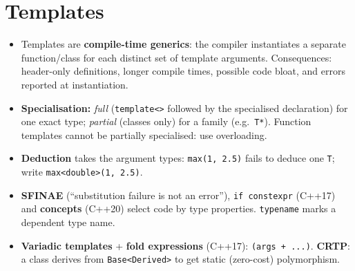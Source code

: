 \documentclass[10pt,a4paper,openany,oneside]{report}
\newcommand{\prio}[1]{\texorpdfstring{\ifcase#1\or{\color{gold}\ding{72}}\or{\color{gold}\ding{72}\ding{72}}\or{\color{gold}\ding{72}\ding{72}\ding{72}}\fi}{}}
\begin{document}
\section{Templates \prio{3}}
\begin{mustbox}
\begin{itemize}[nosep]
\item Templates are \textbf{compile-time generics}: the compiler instantiates a separate function/class for each distinct set of template arguments. Consequences: header-only definitions, longer compile times, possible code bloat, and errors reported at instantiation.
\item \textbf{Specialisation:} \emph{full} (\texttt{template<>} followed by the specialised declaration) for one exact type; \emph{partial} (classes only) for a family (e.g.\ \texttt{T*}). Function templates cannot be partially specialised: use overloading.
\item \textbf{Deduction} takes the argument types: \texttt{max(1, 2.5)} fails to deduce one \texttt{T}; write \texttt{max<double>(1, 2.5)}.
\item \textbf{SFINAE} (``substitution failure is not an error''), \texttt{if constexpr} (C++17) and \textbf{concepts} (C++20) select code by type properties. \texttt{typename} marks a dependent type name.
\item \textbf{Variadic templates} + \textbf{fold expressions} (C++17): \texttt{(args + ...)}. \textbf{CRTP}: a class derives from \texttt{Base<Derived>} to get static (zero-cost) polymorphism.
\end{itemize}
\end{mustbox}
\end{document}
